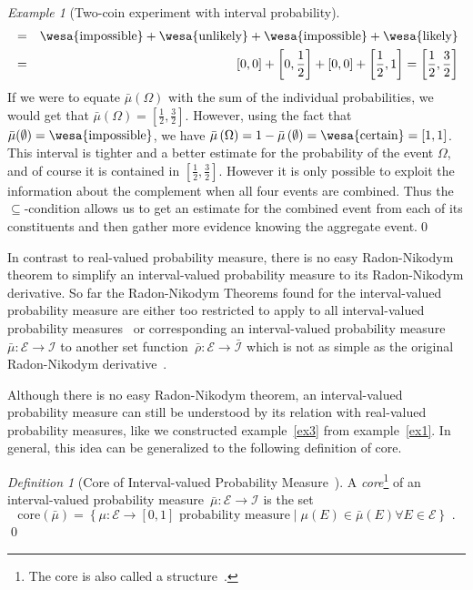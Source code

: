 \documentclass{article}
\theoremstyle{remark}
\newtheorem{example}{Example}
\newtheorem{definition}{Definition}
\newcommand{\events}{\ensuremath{\mathcal{E}}}
\newcommand{\pmeas}{\ensuremath{\mu}}
\newcommand{\imposs}{{\mbox{\wesa{impossible}}}}
\newcommand{\likely}{{\mbox{\wesa{likely}}}}
\newcommand{\unlikely}{{\mbox{\wesa{unlikely}}}}
\newcommand{\necess}{{\mbox{\wesa{certain}}}}
\begin{document}
\begin{example}[Two-coin experiment with interval probability]
\begin{eqnarray*}
 & = & \imposs+\unlikely+\imposs+\likely\\
 & = & \left[0,0\right]+\left[0,\frac{1}{2}\right]+\left[0,0\right]+\left[\frac{1}{2},1\right]=\left[\frac{1}{2},\frac{3}{2}\right]
\end{eqnarray*}
If we were to equate $\bar{\mu}(\Omega)$ with the sum of the individual
probabilities, we would get that $\bar{\mu}(\Omega)=\left[\frac{1}{2},\frac{3}{2}\right]$.
However, using the fact that $\bar{\mu}(\emptyset)=\imposs$, we have
$\bar{\mu}\left(\Omega\right)=1-\bar{\mu}\left(\emptyset\right)=\necess=[1,1]$.
This interval is tighter and a better estimate for the probability
of the event $\Omega$, and of course it is contained in $[\frac{1}{2},\frac{3}{2}]$.
However it is only possible to exploit the information about the complement
when all four events are combined. Thus the $\subseteq$-condition
allows us to get an estimate for the combined event from each of its
constituents and then gather more evidence knowing the aggregate event.\qed\end{example}

In contrast to real-valued probability measure, there is no easy Radon-Nikodym
theorem to simplify an interval-valued probability measure to its
Radon-Nikodym derivative. So far the Radon-Nikodym Theorems found
for the interval-valued probability measure are either too restricted
to apply to all interval-valued probability measures~\cite{Choquet1954,Graf1980,Goodman2013}
or corresponding an interval-valued probability measure~$\bar{\mu}:\events\rightarrow\mathscr{I}$
to another set function~$\bar{\rho}:\events\rightarrow\bar{\mathscr{I}}$
which is not as simple as the original Radon-Nikodym derivative~\cite{GilboaSchmeidler1994,Goodman2013}.

Although there is no easy Radon-Nikodym theorem, an interval-valued
probability measure can still be understood by its relation with real-valued
probability measures, like we constructed example~\ref{ex3} from
example~\ref{ex1}. In general, this idea can be generalized to the
following definition of core.

\begin{definition}[Core of Interval-valued Probability Measure~\cite{GilboaSchmeidler1994,Marinacci1999,Teran2014}]\label{def:CoreInterval-valuedProbability}
A \emph{core}\footnote{The core is also called a structure~\cite{Weichselberger2000}.}
of an interval-valued probability measure~$\bar{\mu}:\events\rightarrow\mathscr{I}$
is the set
\[
\mathrm{core}\left(\bar{\mu}\right)=\left\{ \pmeas:\events\rightarrow[0,1]\textrm{ probability measure}\middle|\pmeas\left(E\right)\in\bar{\mu}\left(E\right)\forall E\in\events\right\} \textrm{ .}
\]
\qed\end{definition}
\end{document}
